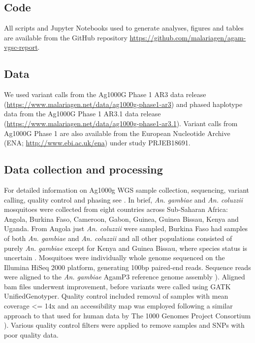 \documentclass[a4paper,11pt,abstracton,hidelinks]{scrartcl}
\begin{document}
\subsection*{Code}

%
All scripts and Jupyter Notebooks used to generate analyses, figures and tables are available from the GitHub repository \url{https://github.com/malariagen/agam-vgsc-report}.


\subsection*{Data}

%
We used variant calls from the Ag1000G Phase 1 AR3 data release (\url{https://www.malariagen.net/data/ag1000g-phase1-ar3}) and phased haplotype data from the Ag1000G Phase 1 AR3.1 data release (\url{https://www.malariagen.net/data/ag1000g-phase1-ar3.1}).
%
Variant calls from Ag1000G Phase 1 are also available from the European Nucleotide Archive (ENA; \url{http://www.ebi.ac.uk/ena}) under study PRJEB18691.


\subsection*{Data collection and processing}

%
For detailed information on Ag1000g WGS sample collection, sequencing, variant calling, quality control and phasing see \cite{Ag1000gConsortium2017}.
%
In brief, \emph{An. gambiae} and \emph{An. coluzzii} mosquitoes were collected from eight countries across Sub-Saharan Africa: Angola, Burkina Faso, Cameroon, Gabon, Guinea, Guinea Bissau, Kenya and Uganda.
%
From Angola just \emph{An. coluzzii} were sampled, Burkina Faso had samples of both \emph{An. gambiae} and \emph{An. coluzzii} and all other populations consisted of purely \emph{An. gambiae} except for Kenya and Guinea Bissau, where species status is uncertain \cite{Ag1000gConsortium2017}.
%
Mosquitoes were individually whole genome sequenced on the Illumina HiSeq 2000 platform, generating 100bp paired-end reads.
%
Sequence reads were aligned to the \emph{An. gambiae} AgamP3 reference genome assembly \cite{Holt2002}).
%
Aligned bam files underwent improvement, before variants were called using GATK UnifiedGenotyper.
%
Quality control included removal of samples with mean coverage <= 14x and an accessibility map was employed following a similar approach to that used for human data by The 1000 Genomes Project Consortium \cite{The1000GenomesProjectConsortium2010}).
%
Various quality control filters were applied to remove samples and SNPs with poor quality data.
\end{document}

